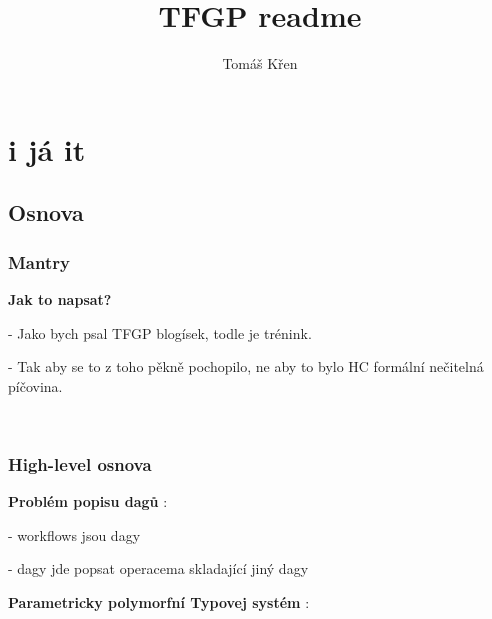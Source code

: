 \documentclass[a4paper,oneside]{memoir}
\title{TFGP readme}
\author{Tomáš Křen}
\begin{document}
\theoremstyle{plain} 
\newtheorem{theorem}{Theorem} 
\newtheorem{proposition}{Proposition} 
\newtheorem{lemma}{Lemma} 
\newtheorem{preLemma}{Pre-Lemma} 
\newtheorem*{corollary}{Corollary}

\theoremstyle{definition} 
\newtheorem*{definition}{Definition} 
\newtheorem*{preDefinition}{Pre-Definition} 
\newtheorem{conjecture}{Conjecture}
\newtheorem*{example}{Example} 

\theoremstyle{remark} 
\newtheorem*{remark}{Remark} 
\newtheorem*{note}{Note} 
\newtheorem{case}{Case}

\frontmatter
\mainmatter
\maketitle


\tableofcontents*

\newcommand{\red}[1]{{\color{red} #1}}

\chapter{i já it}

\section{Osnova}

\subsection{Mantry}

\textbf{Jak to napsat?}

- Jako bych psal TFGP blogísek, todle je trénink.

- Tak aby se to z toho pěkně pochopilo, ne aby to bylo HC formální nečitelná píčovina.

~\\

\subsection{High-level osnova}

\textbf{Problém popisu dagů} : 

- workflows jsou dagy

- dagy jde popsat operacema skladající jiný dagy

\textbf{Parametricky polymorfní Typovej systém} : 
\end{document}
